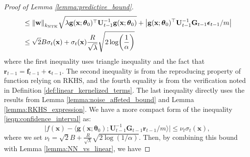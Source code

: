 \begin{proof}[Proof of Lemma \ref{lemma:predictive_bound}]
\begin{equation}
\begin{split}
        & \leq  \norm{\mathbf{w}}_{k_{\text{NTK}}}  \sqrt {\lambda \mathbf{g}(\mathbf{x}; \boldsymbol{\theta}_0)^\top \mathbf{U}^{-1}_{t-1} \mathbf{g}(\mathbf{x}; \boldsymbol{\theta}_0)}  + \left\lvert \mathbf{g}(\mathbf{x}; \boldsymbol{\theta}_0)^\top \mathbf{U}^{-1}_{t-1} \mathbf{G}_{t-1} \boldsymbol{\epsilon}_{t-1}/m   \right\rvert \\
        & \leq \sqrt{2}B \sigma_t(\mathbf{x}) + \sigma_t(\mathbf{x})\frac{R}{\sqrt{\lambda}} \sqrt{2 \log(\frac{1}{\alpha})} \\
    \end{split}
\end{equation}
where the first inequality uses triangle inequality and the fact that $\mathbf{r}_{t-1}= \mathbf{f}_{t-1} + \boldsymbol{\epsilon}_{t-1}$. The second inequality is from the reproducing property of function relying on RKHS, and the fourth equality is from the verification noted in Definition  \ref{def:linear_kernelized_terms}. The last inequality directly uses the results from Lemma \ref{lemma:noise_affeted_bound} and Lemma \ref{lemma:RKHS_expression}. We have a more compact form of the inequality \ref{ieqn:confidence_interval} as: 
\[\rvert f(\mathbf{x}) - \langle \mathbf{g}(\mathbf{x}; \boldsymbol{\theta}_0); \mathbf{U}^{-1}_{t-1} \mathbf{G}_{t-1} \mathbf{r}_{t-1}/m \rangle \lvert \leq \nu_t \sigma_t (\mathbf{x}), 
\]
where we set $\nu_t = \sqrt{2}B + \frac{R}{\sqrt{\lambda}}\sqrt{2 \log(1/ \alpha)}$. 
Then, by combining this bound with
Lemma \ref{lemma:NN_vs_linear}, we have


\end{proof}
